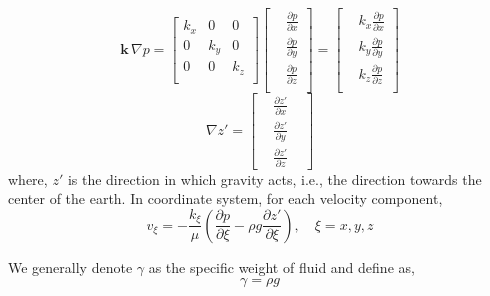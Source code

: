 \documentclass{llncs}
\numberwithin{equation}{section}
\numberwithin{figure}{section}
\numberwithin{table}{section}
\begin{document}
    \begin{equation*}
        \mathbf{k}\,\nabla p=\begin{bmatrix}
             {{k}_{x}} & 0 & 0  \\
             0 & {{k}_{y}} & 0  \\
             0 & 0 & {{k}_{z}}  \\
            \end{bmatrix}\begin{bmatrix}
            & \frac{\partial p}{\partial x} \\
            & \frac{\partial p}{\partial y} \\
            & \frac{\partial p}{\partial z} \\
            \end{bmatrix} = \begin{bmatrix}
            & {{k}_{x}}\frac{\partial p}{\partial x} \\
            & {{k}_{y}}\frac{\partial p}{\partial y} \\
            & {{k}_{z}}\frac{\partial p}{\partial z} \\
            \end{bmatrix}
        \label{Permeability_Tensor}
    \end{equation*}
    \begin{equation*}
        \nabla {z}'=\begin{bmatrix}
        & \frac{\partial {z}'}{\partial x} & \\
        & \frac{\partial {z}'}{\partial y} & \\
        &\frac{\partial {z}'}{\partial z}  &
        \end{bmatrix}
        \label{Z}
    \end{equation*}
    where, ${z}'$ is the direction in which gravity acts, i.e., the direction towards the center of the earth.
    In  coordinate system,  for each velocity component,
    \begin{equation}
    {{v}_{\xi }}=-\frac{{{k}_{\xi }}}{\mu }\left( \frac{\partial p}{\partial \xi }-\rho g\frac{\partial z'}{\partial \xi } \right),\quad \xi =x,y,z
        \label{Darcy_velocity}
    \end{equation}

    We generally denote $\gamma$ as the specific weight of fluid and define as,
    \begin{equation*}
        \gamma =\rho g
        \label{Specific_weight}
    \end{equation*}
\end{document}
